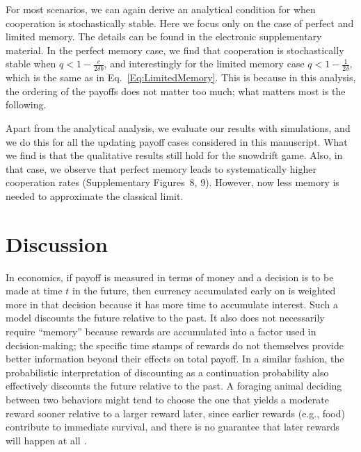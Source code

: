 \documentclass[11pt]{article}
\theoremstyle{plainCl1}
\theoremstyle{plainCl2}
\begin{document}
For most scenarios, we can again derive an analytical condition for when
cooperation is stochastically stable. Here we focus only on the case of perfect
and limited memory. The details can be found in the electronic supplementary
material. In the perfect memory case, we find that cooperation is stochastically
stable when \(q < 1 - \frac{c}{2 \delta b}\), and interestingly for the limited
memory case \(q < 1 - \frac{1}{2 \delta}\), which is the same as in
Eq.~\eqref{Eq:LimitedMemory}. This is because in this analysis, the ordering of
the payoffs does not matter too much; what matters most is the following.

Apart from the analytical analysis, we evaluate our results with simulations,
and we do this for all the updating payoff cases considered in this manuscript.
What we find is that the qualitative results still hold for the snowdrift game.
Also, in that case, we observe that perfect memory leads to systematically
higher cooperation rates (Supplementary Figures~8, 9). However, now less memory
is needed to approximate the classical limit.


\section{Discussion}\label{section:discussion}
%
In economics, if payoff is measured in terms of money and a decision is to be made at time $t$ in the future, then currency accumulated early on is weighted more in that decision because it has more time to accumulate interest. Such a model discounts the future relative to the past. It also does not necessarily require ``memory'' because rewards are accumulated into a factor used in decision-making; the specific time stamps of rewards do not themselves provide better information beyond their effects on total payoff. In a similar fashion, the probabilistic interpretation of discounting as a continuation probability \citep{axelrod1981evolution} also effectively discounts the future relative to the past. A foraging animal deciding between two behaviors might tend to choose the one that yields a moderate reward sooner relative to a larger reward later, since earlier rewards (e.g., food) contribute to immediate survival, and there is no guarantee that later rewards will happen at all \citep{stephens1986foraging}.
\end{document}
